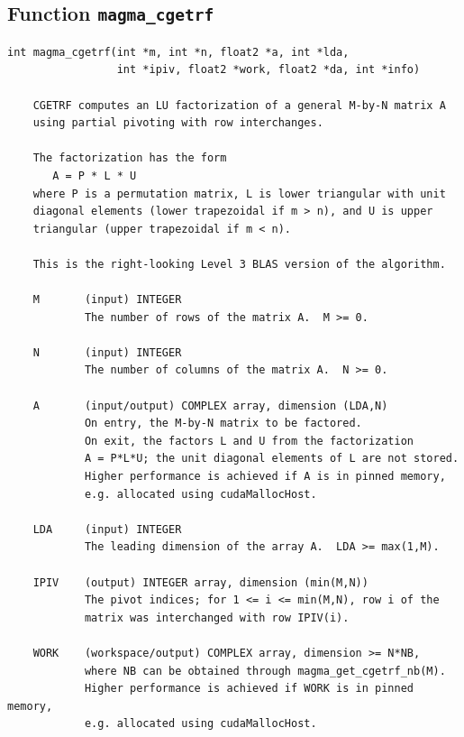 \documentclass[10pt]{book}
\begin{document}

\newpage
\subsection{Function {\tt {\bf magma\_cgetrf}}}
\begin{verbatim}
int magma_cgetrf(int *m, int *n, float2 *a, int *lda, 
                 int *ipiv, float2 *work, float2 *da, int *info)
                    
    CGETRF computes an LU factorization of a general M-by-N matrix A   
    using partial pivoting with row interchanges.   

    The factorization has the form   
       A = P * L * U   
    where P is a permutation matrix, L is lower triangular with unit   
    diagonal elements (lower trapezoidal if m > n), and U is upper   
    triangular (upper trapezoidal if m < n).   

    This is the right-looking Level 3 BLAS version of the algorithm.   

    M       (input) INTEGER   
            The number of rows of the matrix A.  M >= 0.   

    N       (input) INTEGER   
            The number of columns of the matrix A.  N >= 0.   

    A       (input/output) COMPLEX array, dimension (LDA,N)   
            On entry, the M-by-N matrix to be factored.   
            On exit, the factors L and U from the factorization   
            A = P*L*U; the unit diagonal elements of L are not stored.   
            Higher performance is achieved if A is in pinned memory, 
            e.g. allocated using cudaMallocHost.

    LDA     (input) INTEGER   
            The leading dimension of the array A.  LDA >= max(1,M).   

    IPIV    (output) INTEGER array, dimension (min(M,N))   
            The pivot indices; for 1 <= i <= min(M,N), row i of the   
            matrix was interchanged with row IPIV(i).   

    WORK    (workspace/output) COMPLEX array, dimension >= N*NB,
            where NB can be obtained through magma_get_cgetrf_nb(M).
            Higher performance is achieved if WORK is in pinned memory, 
            e.g. allocated using cudaMallocHost.


\end{verbatim}
\end{document}
